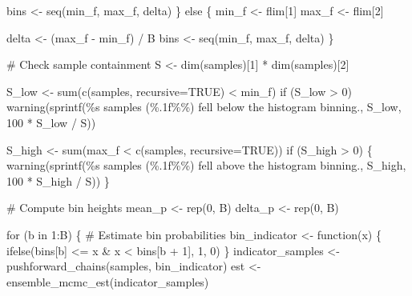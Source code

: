 \documentclass[
  letterpaper,
  DIV=11,
  numbers=noendperiod]{scrartcl}
\newenvironment{Shaded}{\begin{snugshade}}{\end{snugshade}}
\newcommand{\BuiltInTok}[1]{\textcolor[rgb]{0.00,0.23,0.31}{#1}}
\newcommand{\CommentTok}[1]{\textcolor[rgb]{0.37,0.37,0.37}{#1}}
\newcommand{\ControlFlowTok}[1]{\textcolor[rgb]{0.00,0.23,0.31}{#1}}
\newcommand{\DecValTok}[1]{\textcolor[rgb]{0.68,0.00,0.00}{#1}}
\newcommand{\KeywordTok}[1]{\textcolor[rgb]{0.00,0.23,0.31}{#1}}
\newcommand{\NormalTok}[1]{\textcolor[rgb]{0.00,0.23,0.31}{#1}}
\newcommand{\OperatorTok}[1]{\textcolor[rgb]{0.37,0.37,0.37}{#1}}
\newcommand{\SpecialCharTok}[1]{\textcolor[rgb]{0.37,0.37,0.37}{#1}}
\newcommand{\StringTok}[1]{\textcolor[rgb]{0.13,0.47,0.30}{#1}}
\begin{document}
\begin{Shaded}
\begin{Highlighting}[]
\NormalTok{    bins }\OperatorTok{\textless{}{-}}\NormalTok{ seq(min\_f, max\_f, delta)}
\NormalTok{  \} }\ControlFlowTok{else}\NormalTok{ \{}
\NormalTok{    min\_f }\OperatorTok{\textless{}{-}}\NormalTok{ flim[}\DecValTok{1}\NormalTok{]}
\NormalTok{    max\_f }\OperatorTok{\textless{}{-}}\NormalTok{ flim[}\DecValTok{2}\NormalTok{]}
    
\NormalTok{    delta }\OperatorTok{\textless{}{-}}\NormalTok{ (max\_f }\OperatorTok{{-}}\NormalTok{ min\_f) }\OperatorTok{/}\NormalTok{ B}
\NormalTok{    bins }\OperatorTok{\textless{}{-}}\NormalTok{ seq(min\_f, max\_f, delta)}
\NormalTok{  \}}
  
  \CommentTok{\# Check sample containment}
\NormalTok{  S }\OperatorTok{\textless{}{-}}\NormalTok{ dim(samples)[}\DecValTok{1}\NormalTok{] }\OperatorTok{*}\NormalTok{ dim(samples)[}\DecValTok{2}\NormalTok{]}
  
\NormalTok{  S\_low }\OperatorTok{\textless{}{-}} \BuiltInTok{sum}\NormalTok{(c(samples, recursive}\OperatorTok{=}\NormalTok{TRUE) }\OperatorTok{\textless{}}\NormalTok{ min\_f)}
  \ControlFlowTok{if}\NormalTok{ (S\_low }\OperatorTok{\textgreater{}} \DecValTok{0}\NormalTok{)}
\NormalTok{    warning(sprintf(}\StringTok{\textquotesingle{}}\SpecialCharTok{\%s}\StringTok{ samples (}\SpecialCharTok{\%.1f\%\%}\StringTok{) fell below the histogram binning.\textquotesingle{}}\NormalTok{,}
\NormalTok{                    S\_low, }\DecValTok{100} \OperatorTok{*}\NormalTok{ S\_low }\OperatorTok{/}\NormalTok{ S))}
  
\NormalTok{  S\_high }\OperatorTok{\textless{}{-}} \BuiltInTok{sum}\NormalTok{(max\_f }\OperatorTok{\textless{}}\NormalTok{ c(samples, recursive}\OperatorTok{=}\NormalTok{TRUE))}
  \ControlFlowTok{if}\NormalTok{ (S\_high }\OperatorTok{\textgreater{}} \DecValTok{0}\NormalTok{) \{}
\NormalTok{    warning(sprintf(}\StringTok{\textquotesingle{}}\SpecialCharTok{\%s}\StringTok{ samples (}\SpecialCharTok{\%.1f\%\%}\StringTok{) fell above the histogram binning.\textquotesingle{}}\NormalTok{,}
\NormalTok{                    S\_high, }\DecValTok{100} \OperatorTok{*}\NormalTok{ S\_high }\OperatorTok{/}\NormalTok{ S))}
\NormalTok{  \}}
  
  \CommentTok{\# Compute bin heights}
\NormalTok{  mean\_p }\OperatorTok{\textless{}{-}}\NormalTok{ rep(}\DecValTok{0}\NormalTok{, B)}
\NormalTok{  delta\_p }\OperatorTok{\textless{}{-}}\NormalTok{ rep(}\DecValTok{0}\NormalTok{, B)}
  
  \ControlFlowTok{for}\NormalTok{ (b }\KeywordTok{in} \DecValTok{1}\NormalTok{:B) \{}
    \CommentTok{\# Estimate bin probabilities}
\NormalTok{    bin\_indicator }\OperatorTok{\textless{}{-}}\NormalTok{ function(x) \{}
\NormalTok{      ifelse(bins[b] }\OperatorTok{\textless{}=}\NormalTok{ x }\OperatorTok{\&}\NormalTok{ x }\OperatorTok{\textless{}}\NormalTok{ bins[b }\OperatorTok{+} \DecValTok{1}\NormalTok{], }\DecValTok{1}\NormalTok{, }\DecValTok{0}\NormalTok{)}
\NormalTok{    \}}
\NormalTok{    indicator\_samples }\OperatorTok{\textless{}{-}}\NormalTok{ pushforward\_chains(samples, bin\_indicator)}
\NormalTok{    est }\OperatorTok{\textless{}{-}}\NormalTok{ ensemble\_mcmc\_est(indicator\_samples)}
    

\end{Highlighting}
\end{Shaded}
\end{document}
